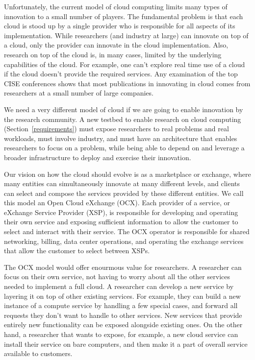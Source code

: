Unfortunately, the current model of cloud computing limits many types
of innovation to a small number of players.  The fundamental problem
is that each cloud is stood up by a single provider who is responsible
for all aspects of its implementation.  While researchers (and
industry at large) can innovate on top of a cloud, only the provider
can innovate in the cloud implementation.  Also, research on top of
the cloud is, in many cases, limited by the underlying capabilities of
the cloud.  For example, one can't explore real time use of a cloud if
the cloud doesn't provide the required services.  Any examination of
the top CISE conferences shows that most publications in innovating in
cloud comes from researchers at a small number of large companies.

We need a very different model of cloud if we are going to enable
innovation by the research community.  A new testbed to enable
research on cloud computing (Section~\ref{requirements}) must expose
researchers to real problems and real workloads, must involve
industry, and must have an architecture that enables researchers to
focus on a problem, while being able to depend on and leverage a
broader infrastructure to deploy and exercise their innovation.

Our vision on how the cloud should evolve is as a marketplace or
exchange, where many entities can simultaneously innovate at many
different levels, and clients can select and compose the services
provided by these different entities.  We call this model an Open
Cloud eXchange (OCX).  Each provider of a service, or eXchange Service
Provider (XSP), is responsible for developing and operating their own
service and exposing sufficient information to allow the customer to
select and interact with their service.  The OCX operator is
responsible for shared networking, billing, data center operations,
and operating the exchange services that allow the customer to select
between XSPs.

The OCX model would offer enourmous value for researchers.  A
researcher can focus on their own service, not having to worry about
all the other services needed to implement a full cloud.  A researcher
can develop a new service by layering it on top of other existing
services.  For example, they can build a new instance of a compute
service by handling a few special cases, and forward all requests
they don't want to handle to other services.  New services that
provide entirely new functionality can be exposed alongside existing
ones.  On the other hand, a researcher that wants to expose, for
example, a new cloud service can install their service on bare
computers, and then make it a part of overall service available to
customers.

